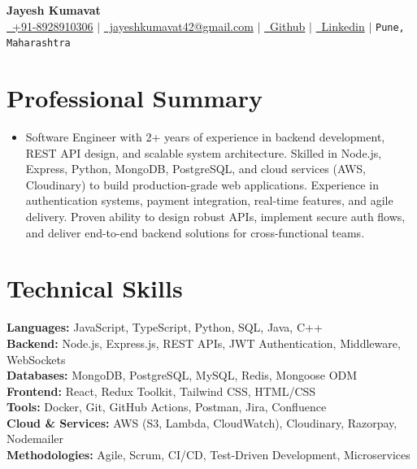 \documentclass[letterpaper,11pt]{article}
\begin{document}
\begin{center}
  \textbf{\Huge Jayesh Kumavat} \\
  \vspace{3pt}
  \small \hspace{1pt} \href{tel:+918928910306}{\faPhone\ +91-8928910306} $|$ \hspace{1pt} \href{mailto:jayeshkumavat42@gmail.com}{\faEnvelope\ jayeshkumavat42@gmail.com} $|$
  \hspace{1pt} \href{https://github.com/jayesh-kumavat}{\faGithub\ Github} $|$ \hspace{1pt} \href{https://www.linkedin.com/in/jayesh-kumavat-03709630a/}{\faLinkedin\ Linkedin} $|$ \hspace{1pt} \faMapMarker* \texttt{Pune, Maharashtra}
\end{center}

\section{Professional Summary}
\begin{itemize}[leftmargin=0in, label={}]
  \item\small{
    Software Engineer with 2+ years of experience in backend development, REST API design, and scalable system architecture. Skilled in Node.js, Express, Python, MongoDB, PostgreSQL, and cloud services (AWS, Cloudinary) to build production-grade web applications. Experience in authentication systems, payment integration, real-time features, and agile delivery. Proven ability to design robust APIs, implement secure auth flows, and deliver end-to-end backend solutions for cross-functional teams.
  }
\end{itemize}

\section{Technical Skills}
\begin{itemize}[leftmargin=0in, label={}]
  \small{\item{
    \textbf{Languages:} JavaScript, TypeScript, Python, SQL, Java, C++ \\
    \textbf{Backend:} Node.js, Express.js, REST APIs, JWT Authentication, Middleware, WebSockets \\
    \textbf{Databases:} MongoDB, PostgreSQL, MySQL, Redis, Mongoose ODM \\
    \textbf{Frontend:} React, Redux Toolkit, Tailwind CSS, HTML/CSS \\
    \textbf{Tools:} Docker, Git, GitHub Actions, Postman, Jira, Confluence \\
    \textbf{Cloud \& Services:} AWS (S3, Lambda, CloudWatch), Cloudinary, Razorpay, Nodemailer \\
    \textbf{Methodologies:} Agile, Scrum, CI/CD, Test-Driven Development, Microservices
  }}
\end{itemize}
\end{document}
